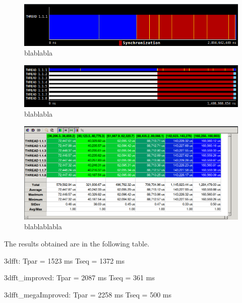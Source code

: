 \documentclass[12]{article}
\begin{document}
\begin{figure}[H]
\centering  \includegraphics[width=\linewidth]{images/TempsVersio1Processador1.png}
  \caption{blablabla}
  \label{fig:tempsv1Proc1}
\end{figure}




\begin{figure}[H]
\centering  \includegraphics[width=\linewidth]{images/TempsVersio1Processador8.png}
  \caption{blablabla}
  \label{fig:tempsParalv1Proc8}
\end{figure}



\begin{figure}[H]
\centering  \includegraphics[width=\linewidth]{images/TempsParalVersio1Processador8.png}
  \caption{blablablabla}
  \label{fig:tempsParalv1Proc8}
\end{figure}




The results obtained are in the following table.

3dfft:
Tpar = 1523 ms
Tseq = 1372 ms

3dfft\_improved:
Tpar = 2087 ms
Tseq = 361 ms

3dfft\_megaImproved:
Tpar = 2258 ms
Tseq = 500 ms
\end{document}

